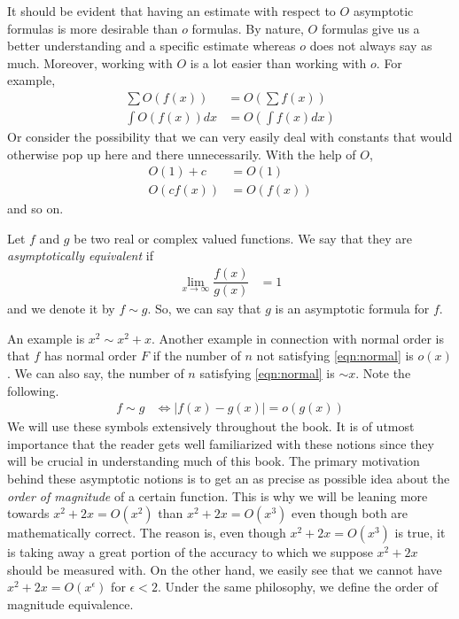 \documentclass[elemannt.tex]{subfile}
\begin{document}
	It should be evident that having an estimate with respect to $O$ asymptotic formulas is more desirable than $o$ formulas. By nature, $O$ formulas give us a better understanding and a specific estimate whereas $o$ does not always say as much. Moreover, working with $O$ is a lot easier than working with $o$. For example,
		\begin{align*}
			\sum O(f(x))
				& = O\left(\sum f(x)\right)\\
			\int O(f(x))dx
				& = O\left(\int f(x)dx\right)
		\end{align*}
	Or consider the possibility that we can very easily deal with constants that would otherwise pop up here and there unnecessarily. With the help of $O$,
		\begin{align*}
			O(1)+c
				& = O(1)\\
			O(cf(x))
				& = O(f(x))
		\end{align*}
	and so on.
		\begin{definition}[Equivalence]
			Let $f$ and $g$ be two real or complex valued functions. We say that they are \textit{asymptotically equivalent} if
				\begin{align*}
					\lim\limits_{x\to\infty}\dfrac{f(x)}{g(x)}
						& = 1
				\end{align*}
			and we denote it by $f\sim g$. So, we can say that $g$ is an asymptotic formula for $f$.
		\end{definition}
	An example is $x^{2}\sim x^{2}+x$. Another example in connection with normal order is that $f$ has normal order $F$ if the number of $n$ not satisfying \ref{eqn:normal} is $o(x)$. We can also say, the number of $n$ satisfying \ref{eqn:normal} is $\sim x$. Note the following.
		\begin{align*}
			f \sim g
				& \iff |f(x)-g(x)|= o(g(x))
		\end{align*}
	We will use these symbols extensively throughout the book. It is of utmost importance that the reader gets well familiarized with these notions since they will be crucial in understanding much of this book. The primary motivation behind these asymptotic notions is to get an as precise as possible idea about the \textit{order of magnitude} of a certain function. This is why we will be leaning more towards $x^{2}+2x=O(x^{2})$ than $x^{2}+2x=O(x^{3})$ even though both are mathematically correct. The reason is, even though $x^{2}+2x=O(x^{3})$ is true, it is taking away a great portion of the accuracy to which we suppose $x^{2}+2x$ should be measured with. On the other hand, we easily see that we cannot have $x^{2}+2x=O(x^{\epsilon})$ for $\epsilon<2$. Under the same philosophy, we define the order of magnitude equivalence.
\end{document}
